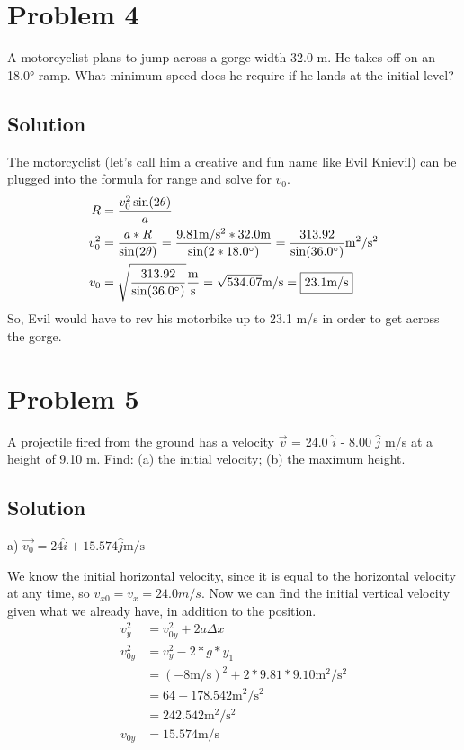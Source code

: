 \documentclass[12pt]{article}
\begin{document}
\pagebreak
\section*{Problem 4}
A motorcyclist plans to jump across a gorge width 32.0 m. He takes off on an 18.0\unit{\degree} ramp.
What minimum speed does he require if he lands at the initial level?

\subsection*{Solution}
The motorcyclist (let's call him a creative and fun name like Evil Knievil) can be plugged into the formula for range and solve for $v_0$.
\begin{align}
    R &= \frac{v_0^2 \sin(2\theta)}{a}\\
    v_0^2 &= \frac{a*R}{\sin(2\theta)} 
        = \frac{9.81\unit{\meter/\second^2} * 32.0\unit{\meter}}{\sin(2*18.0\unit{\degree})}
        = \frac{313.92}{\sin(36.0\unit{\degree})}\unit{\meter^2/\second^2}\\
    v_0 &= \sqrt{\frac{313.92}{\sin(36.0\unit{\degree})}} \unit{\frac{\meter}{\second}} 
        = \sqrt{534.07} \unit{\meter/\second} 
        = \boxed{ 23.1 \unit{\meter/\second} }
\end{align}
So, Evil would have to rev his motorbike up to 23.1 m/s in order to get across the gorge.


\pagebreak
\section*{Problem 5}
A projectile fired from the ground has a velocity $\vec{v}$ = 24.0 $\hat{i}$ - 8.00 $\hat{j}$ m/s at a height of 9.10 m. Find: (a) the initial velocity; (b) the maximum height.

\subsection*{Solution}
a) $ \vec{v_0} = 24\hat{i} + 15.574 \hat{j} \unit{\meter/\second} $

We know the initial horizontal velocity, since it is equal to the horizontal velocity at any time, so $ v_{x0} = v_x = 24.0 \unit{m/s} $. Now we can find the initial vertical velocity given what we already have, in addition to the position.
\begin{align}
    v_y^2 &= v_{0y}^2 + 2a\Delta x\\
    v_{0y}^2 &= v_y^2 - 2*g*y_1\\
            &= (-8\unit{\meter/\second})^2 + 2*9.81*9.10 \unit{\meter^2/\second^2}\\
            &= 64 + 178.542 \unit{\meter^2/\second^2}\\
            &= 242.542 \unit{\meter^2/\second^2}\\
    v_{0y} &= 15.574 \unit{\meter/\second}
\end{align}
\end{document}

